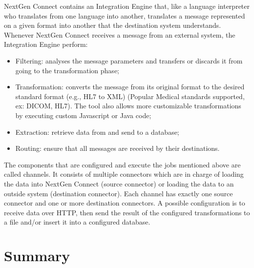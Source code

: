 NextGen Connect\cite{nextgen} contains an Integration Engine that, like a language interpreter who translates from one language into another, translates a message represented on a given format into another that the destination system understands.
Whenever NextGen Connect receives a message from an external system, the Integration Engine perform:
\begin{itemize}
    \item Filtering: analyses the message parameters and transfers or discards it from going to the transformation phase;
    \item Transformation: converts the message from its original format to the desired standard format (e.g., HL7 to XML) (Popular Medical standards supported, ex: DICOM, HL7). The tool also allows more customizable transformations by executing custom Javascript or Java code;
    \item Extraction: retrieve data from and send to a database;
    \item Routing: ensure that all messages are received by their destinations.
\end{itemize}
The components that are configured and execute the jobs mentioned above are called channels.
It consists of multiple connectors which are in charge of loading the data into NextGen Connect (source connector) or loading the data to an outside system (destination connector).
Each channel has exactly one source connector and one or more destination connectors.
A possible configuration is to receive data over HTTP, then send the result of the configured transformations to a file and/or insert it into a configured database.

\section{Summary}

